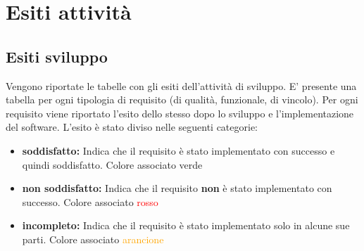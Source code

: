 \documentclass[a4paper,13pt,twoside]{article}
\begin{document}


%

\newpage
\section{Esiti attività} \label{sec:esiti}
\subsection{Esiti sviluppo} \label{sec:esitisviluppo}
Vengono riportate le tabelle con gli esiti dell'attività di sviluppo. E' presente una tabella per ogni tipologia di requisito (di qualità, funzionale, di vincolo). Per ogni requisito viene riportato l'esito dello stesso dopo lo sviluppo e l'implementazione del software. L'esito è stato diviso nelle seguenti categorie:
\begin{itemize}
 	\item \textbf{soddisfatto:} Indica che il requisito è stato implementato con successo e quindi soddisfatto. Colore associato \textcolor{green!80!blue}{verde}
 	\item \textbf{non soddisfatto:} Indica che il requisito \textbf{non }è stato implementato con successo. Colore associato \textcolor{red}{rosso}
 	\item \textbf{incompleto:} Indica che il requisito è stato implementato solo in alcune sue parti. Colore associato \textcolor{orange}{arancione}
\end{itemize}

\end{document}
